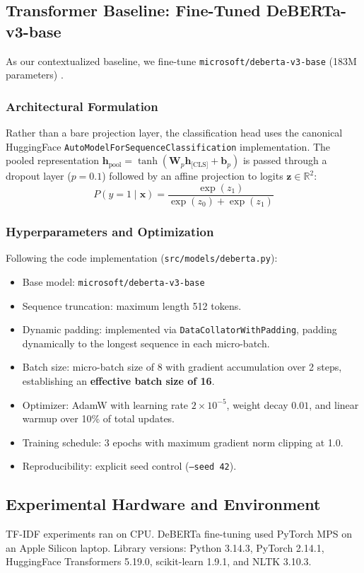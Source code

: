 \documentclass[10pt,conference]{IEEEtran}
\begin{document}
\subsection{Transformer Baseline: Fine-Tuned DeBERTa-v3-base}
As our contextualized baseline, we fine-tune \texttt{microsoft/deberta-v3-base} (183M parameters) \cite{he2021deberta,he2023debertav3}. 

\subsubsection{Architectural Formulation}
Rather than a bare projection layer, the classification head uses the canonical HuggingFace \texttt{AutoModelForSequenceClassification} implementation. The pooled representation $\mathbf{h}_{\text{pool}} = \tanh(\mathbf{W}_p \mathbf{h}_{\text{[CLS]}} + \mathbf{b}_p)$ is passed through a dropout layer ($p=0.1$) followed by an affine projection to logits $\mathbf{z} \in \mathbb{R}^2$:
\begin{equation}
P(y=1 \mid \mathbf{x}) = \frac{\exp(z_1)}{\exp(z_0) + \exp(z_1)}
\end{equation}

\subsubsection{Hyperparameters and Optimization}
Following the code implementation (\texttt{src/models/deberta.py}):
\begin{itemize}
    \item Base model: \texttt{microsoft/deberta-v3-base}
    \item Sequence truncation: maximum length 512 tokens.
    \item Dynamic padding: implemented via \texttt{DataCollatorWithPadding}, padding dynamically to the longest sequence in each micro-batch.
    \item Batch size: micro-batch size of 8 with gradient accumulation over 2 steps, establishing an \textbf{effective batch size of 16}.
    \item Optimizer: AdamW with learning rate $2 \times 10^{-5}$, weight decay $0.01$, and linear warmup over 10\% of total updates.
    \item Training schedule: 3 epochs with maximum gradient norm clipping at 1.0.
    \item Reproducibility: explicit seed control (\texttt{--seed 42}).
\end{itemize}

\subsection{Experimental Hardware and Environment}
TF-IDF experiments ran on CPU. DeBERTa fine-tuning used PyTorch MPS on an Apple Silicon laptop. Library versions:
Python 3.14.3, PyTorch 2.14.1, HuggingFace Transformers 5.19.0, scikit-learn 1.9.1, and NLTK 3.10.3.
\end{document}
